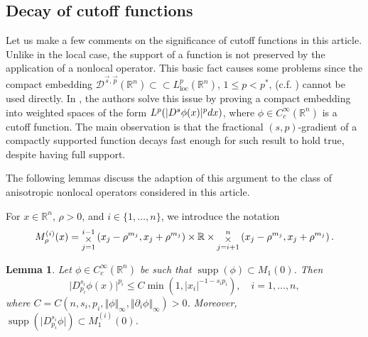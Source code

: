 \documentclass[11pt]{amsart}
\theoremstyle{plain}
\newtheorem{lemma}[theorem]{Lemma}
\theoremstyle{definition}
\numberwithin{equation}{section}
\renewcommand{\d}{\textnormal{d}}
\newcommand{\R}{\mathbb{R}}
\DeclareMathOperator{\supp}{supp}
\newcommand{\Dsp}{\mathcal{D}^{\vec{s},\vec{p}}(\mathbb{R}^n)}
\newcommand{\BIGOP}[1]
{
\mathop{\mathchoice%
{\raise-0.22em\hbox{\huge $#1$}}%
{\raise-0.05em\hbox{\Large $#1$}}{\hbox{\large $#1$}}{#1}}}
\newcommand{\bigtimes}{\BIGOP{\times}}
\begin{document}
\subsection{Decay of cutoff functions}\label{ssec:Decay}

Let us make a few comments on the significance of cutoff functions in this article. Unlike in the local case, the support of a function is not preserved by the application of a nonlocal operator. This basic fact causes some problems since the compact embedding $\Dsp \subset\subset L^{p}_{\mathrm{loc}}(\R^n)$, $1 \le p < p^{\ast}$, (c.f. ) cannot be used directly. In \cite{BSS18}, the authors solve this issue by proving a compact embedding into weighted spaces of the form $L^{p}(\vert D^s \phi(x) \vert^p \d x)$, where $\phi \in C_c^{\infty}(\R^n)$ is a cutoff function. The main observation is that the fractional $(s,p)$-gradient of a compactly supported function decays fast enough for such result to hold true, despite having full support.

The following lemmas discuss the adaption of this argument to the class of anisotropic nonlocal operators considered in this article.

For $x \in \R^n$, $\rho > 0$, and $i\in\{1,\dots,n\}$, we introduce the notation
\begin{equation*}
M_{\rho}^{(i)}(x) = \bigtimes_{j=1}^{i-1} \left(x_j-\rho^{m_j},x_j+\rho^{m_j} \right) \times \R \times \bigtimes_{j=i+1}^{n} \left(x_j-\rho^{m_j},x_j+\rho^{m_j} \right).
\end{equation*}

\begin{lemma}
\label{lem:derdecay}
Let $\phi \in C_c^{\infty}(\R^n)$ be such that $\supp(\phi) \subset M_1(0)$. Then
\begin{equation}
\label{eq:derdecay}
\vert D^{s_i}_{p_i}\phi(x)\vert^{p_i} \le C \min(1,\vert x_i \vert^{-1-s_ip_i}), \quad i = 1,\dots,n,
\end{equation}
where $C = C(n,s_i,p_i,\Vert\phi\Vert_{\infty},\Vert \partial_i \phi\Vert_{\infty})>0$. Moreover, $\supp(\vert D^{s_i}_{p_i}\phi\vert) \subset M_1^{(i)}(0)$.
\end{lemma}
\end{document}
